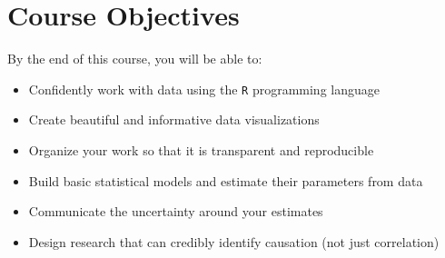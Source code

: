 \documentclass[11pt, letterpaper]{article}
\begin{document}


\section*{Course Objectives}
By the end of this course, you will be able to:
\begin{itemize}
	\item Confidently work with data using the \texttt{R} programming language
	\item Create beautiful and informative data visualizations
	\item Organize your work so that it is transparent and reproducible
	\item Build basic statistical models and estimate their parameters from data
	\item Communicate the uncertainty around your estimates
	\item Design research that can credibly identify causation (not just correlation)
\end{itemize}
\end{document}
